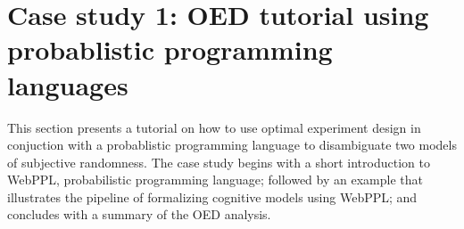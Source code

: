 \documentclass[11pt]{article}
\newcommand{\argmax}{\operatornamewithlimits{argmax}}
\begin{document}

\section{Case study 1: OED tutorial using probablistic programming languages}
\label{s:tutorial}

This section presents a tutorial on how to use optimal experiment design in conjuction with a probablistic programming language to disambiguate two models of subjective randomness. The case study begins with a short introduction to WebPPL, probabilistic programming language; followed by an example that illustrates the pipeline of formalizing cognitive models using WebPPL; and concludes with a summary of the OED analysis. 
\end{document}
